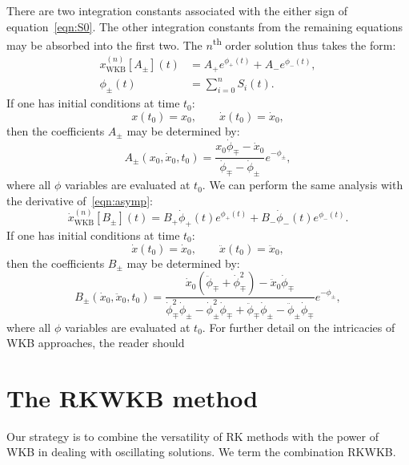 There are two integration constants associated with the either sign of equation~\eqref{eqn:S0}. The other integration constants from the remaining equations may be absorbed into the first two. The \(n\)\textsuperscript{th} order solution thus takes the form:
\begin{align}       
  x_\mathrm{WKB}^{(n)}[A_{\pm}](t) &=
  A_{+} e^{\phi_+(t)} + A_{-} e^{\phi_-(t)},
  \label{eqn:solution} \\
  \phi_\pm(t) &= \sum_{i=0}^{n} S_i(t).
  \label{eqn:phidef} 
\end{align}
If one has initial conditions at time \(t_0\):
\begin{equation}
  x(t_0) = x_0, \qquad \dot{x}(t_0)=\dot{x}_0,
  \label{eqn:i_c}
\end{equation}
then the coefficients \(A_\pm\) may be determined by:
\begin{equation}
    A_\pm(x_0,\dot{x}_0,t_0) = \frac{x_0 \dot{\phi}_\mp- \dot{x}_0 }{\dot{\phi}_\mp - \dot{\phi}_\pm} e^{-\phi_\pm},
  \label{eqn:i_c_Apm}
\end{equation}
where all \(\phi\) variables are evaluated at \(t_0\).
We can perform the same analysis with the derivative of~\eqref{eqn:asymp}:
\begin{equation}       
  \dot{x}_\mathrm{WKB}^{(n)}[B_{\pm}](t) =
  B_{+} \dot{\phi}_+(t)e^{\phi_+(t)} + B_{-} \dot{\phi}_-(t)e^{\phi_-(t)}.
  \label{eqn:solution_xdot}
\end{equation}
If one has initial conditions at time \(t_0\):
\begin{equation}
  \dot{x}(t_0) = \dot{x}_0, \qquad \ddot{x}(t_0)=\ddot{x}_0,
  \label{eqn:i_c_xdot}
\end{equation}
then the coefficients \(B_\pm\) may be determined by:
\begin{equation}
    B_\pm(\dot{x}_0,\ddot{x}_0,t_0) = \frac{\dot{x}_0(\ddot{\phi}_\mp+\dot{\phi}_\mp^{2})-\ddot{x}_0\dot{\phi}_\mp}{\dot{\phi}_\mp^{2}\dot{\phi}_\pm-\dot{\phi}_\pm^{2}\dot{\phi}_\mp+\ddot{\phi}_\mp\dot{\phi}_\pm-\ddot{\phi}_\pm\dot{\phi}_\mp} {{e}^{-{\phi}_\pm}},
  \label{eqn:i_c_Bpm}
\end{equation}
where all \(\phi\) variables are evaluated at \(t_0\).
For further detail on the intricacies of WKB approaches, the reader should 

\section{The RKWKB method}
Our strategy is to combine the versatility of RK methods with the power of WKB in dealing with oscillating solutions. We term the combination RKWKB\@.

